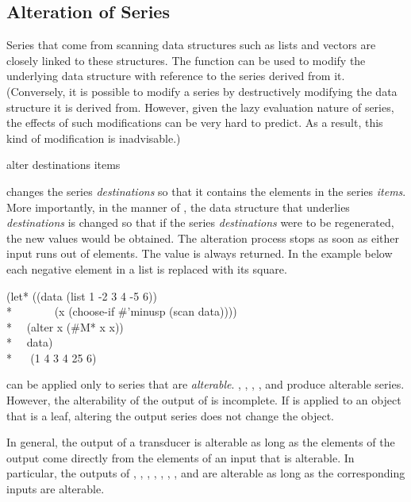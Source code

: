 \subsection{Alteration of Series}

Series that come from scanning data structures such as lists and vectors
are closely linked to these structures.  The function 
 can be used to modify the underlying data structure with
reference to the series derived from it. (Conversely, it is possible to
modify a series by destructively modifying the data structure it is derived
from.  However, given the lazy evaluation nature of series, the effects of
such modifications can be very hard to predict.  As a result, this kind of
modification is inadvisable.)

\begin{defun}[Function]
alter destinations items

 changes the series {\it destinations} so that it contains
the elements in the series {\it items}.  More importantly, in the
manner of , the data structure that underlies {\it
destinations} is changed so that if the series {\it destinations} were
to be regenerated, the new values would be obtained.  The alteration
process stops as soon as either input runs out of elements.  The value
 is always returned. In the example below each negative element in
a list is replaced with its square.
\begin{lisp}
(let* ((data (list 1 -2 3 4 -5 6)) \\*
~~~~~~~(x (choose-if \#'minusp (scan data)))) \\*
~~(alter x (\#M* x x)) \\*
~~data) \\*
~~{\EV} (1 4 3 4 25 6)
\end{lisp}

 can be applied only to series that are {\it alterable}.  
, , , , and
 produce alterable series.  
However, the alterability of
the output of
is incomplete.  If
is applied to an object that is a leaf,
altering the output series does not change the object.

In general, the output of a transducer is alterable as long as the elements
of the output come directly from the elements of an input that is
alterable.  In particular, the outputs of , ,
, , , , ,
and  are alterable as long as the corresponding inputs are
alterable.
\end{defun}


